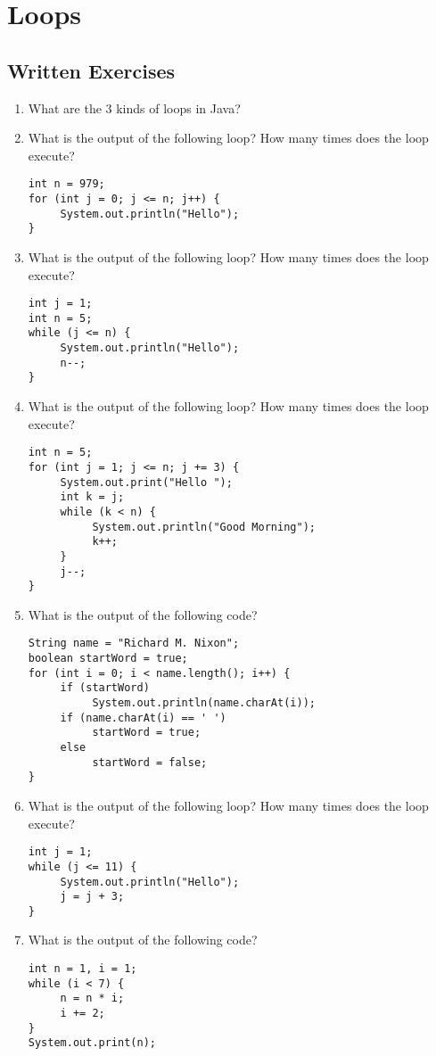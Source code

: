 \section{Loops}

\subsection{Written Exercises}

\setcounter{counter}{1}
\begin{enumerate}[label={\arabic{counter}\addtocounter{counter}{1}}.]

\item What are the 3 kinds of loops in Java?

\item What is the output of the following loop? How many times does the loop execute?
\begin{lstlisting}
int n = 979;
for (int j = 0; j <= n; j++) {
     System.out.println("Hello");
}
\end{lstlisting}

\item What is the output of the following loop? How many times does the loop execute?
\begin{lstlisting}
int j = 1;
int n = 5;
while (j <= n) {
     System.out.println("Hello");
     n--;
}
\end{lstlisting}

\item What is the output of the following loop? How many times does the loop execute?
\begin{lstlisting}
int n = 5;
for (int j = 1; j <= n; j += 3) {
     System.out.print("Hello ");
     int k = j;
     while (k < n) {
          System.out.println("Good Morning");
          k++;
     }
     j--;
}
\end{lstlisting}

\item What is the output of the following code?
\begin{lstlisting}
String name = "Richard M. Nixon";
boolean startWord = true;
for (int i = 0; i < name.length(); i++) {
     if (startWord)
          System.out.println(name.charAt(i));
     if (name.charAt(i) == ' ')
          startWord = true;
     else
          startWord = false;
}
\end{lstlisting}

\item What is the output of the following loop? How many times does the loop execute?
\begin{lstlisting}
int j = 1;
while (j <= 11) {
     System.out.println("Hello");
     j = j + 3;
}
\end{lstlisting}

\item What is the output of the following code?
\begin{lstlisting}
int n = 1, i = 1;
while (i < 7) {
     n = n * i;
     i += 2;
}
System.out.print(n);
\end{lstlisting}

\end{enumerate}

